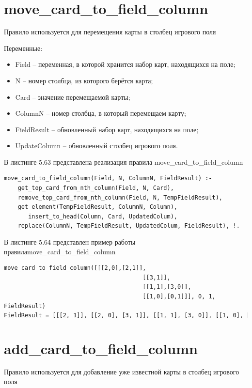 \documentclass[12pt]{report}
\begin{document}
\section{move\_card\_to\_field\_column}
Правило используется для перемещения карты в столбец игрового поля

Переменные:
\begin{itemize}
\item Field – переменная, в которой хранится набор карт, находящихся на поле;
\item N – номер столбца, из которого берётся карта;
\item Card – значение перемещаемой карты;
\item ColumnN – номер столбца, в который перемещаем карту;
\item FieldResult – обновленный набор карт, находящихся на поле;
\item UpdateColumn – обновленный столбец игрового поля.
\end{itemize}

В листинге 5.63 представлена реализация правила move\_card\_to\_field\_column

\begin{lstlisting}[label=some-code, caption=реализация правила move\_card\_to\_field\_column] move_card_to_field_column(Field, N, ColumnN, FieldResult) :-
	get_top_card_from_nth_column(Field, N, Card),
	remove_top_card_from_nth_column(Field, N, TempFieldResult),
	get_element(TempFieldResult, ColumnN, Column),
	   insert_to_head(Column, Card, UpdatedColum),
	replace(ColumnN, TempFieldResult, UpdatedColum, FieldResult), !.
\end{lstlisting}

В листинге 5.64 представлен пример работы правила\newline move\_card\_to\_field\_column

\begin{lstlisting}[label=some-code, caption=реализация правила move\_card\_to\_field\_column]
move_card_to_field_column([[[2,0],[2,1]],
                                        [[3,1]],
                                        [[1,1],[3,0]],
                                        [[1,0],[0,1]]], 0, 1, FieldResult)
FieldResult = [[[2, 1]], [[2, 0], [3, 1]], [[1, 1], [3, 0]], [[1, 0], [0, 1]]]
\end{lstlisting}
\section{add\_card\_to\_field\_column}
Правило используется для добавление уже известной карты в столбец игрового поля
\end{document}
